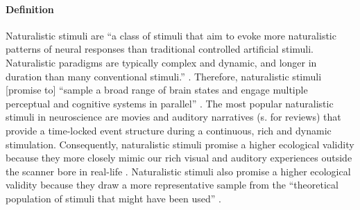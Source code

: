 \paragraph{Definition}

Naturalistic stimuli are ``a class of stimuli that aim to evoke more
naturalistic patterns of neural responses than traditional controlled artificial
stimuli. Naturalistic paradigms are typically complex and dynamic, and longer in
duration than many conventional stimuli.'' \citep{vanderwal2019movies}.
%
Therefore, naturalistic stimuli [promise to] ``sample a broad range of brain
states and engage multiple perceptual and cognitive systems in parallel''
\citep{haxby2020naturalistic}.
The most popular naturalistic stimuli in neuroscience are movies and auditory
narratives (s. \citep{jaaskelainen2021movies, jaaskelainen2020neural} for
reviews) that provide a time-locked event structure during a continuous, rich
and dynamic stimulation.
%
Consequently, naturalistic stimuli promise a higher ecological validity
\citep{zaki2009need, hasson2012future, hamilton2018revolution} because they more
closely mimic our rich visual and auditory experiences outside the scanner bore
in real-life \citep{hasson2008neurocinematics, haxby2020naturalistic}.
%
Naturalistic stimuli also promise a higher ecological validity because they draw
a more representative sample from the ``theoretical population of stimuli that
might have been used'' \citep{westfall2016fixing}.



